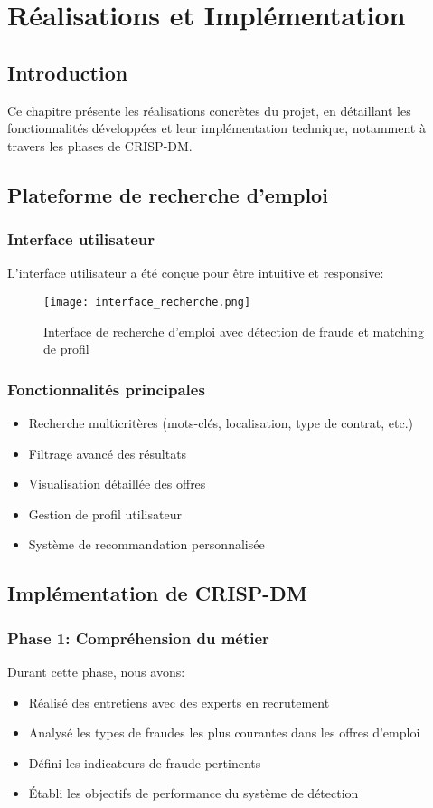 \documentclass[10pt,a4paper,twocolumn]{article}
\begin{document}
\section{Réalisations et Implémentation}
\subsection{Introduction}
Ce chapitre présente les réalisations concrètes du projet, en détaillant les fonctionnalités développées et leur implémentation technique, notamment à travers les phases de CRISP-DM.

\subsection{Plateforme de recherche d'emploi}
\subsubsection{Interface utilisateur}
L'interface utilisateur a été conçue pour être intuitive et responsive:
\begin{figure}[H]
\centering
\texttt{[image: interface\_recherche.png]}
\caption{Interface de recherche d'emploi avec détection de fraude et matching de profil}
\end{figure}

\subsubsection{Fonctionnalités principales}
\begin{itemize}
    \item Recherche multicritères (mots-clés, localisation, type de contrat, etc.)
    \item Filtrage avancé des résultats
    \item Visualisation détaillée des offres
    \item Gestion de profil utilisateur
    \item Système de recommandation personnalisée
\end{itemize}

\subsection{Implémentation de CRISP-DM}
\subsubsection{Phase 1: Compréhension du métier}
Durant cette phase, nous avons:
\begin{itemize}
    \item Réalisé des entretiens avec des experts en recrutement
    \item Analysé les types de fraudes les plus courantes dans les offres d'emploi
    \item Défini les indicateurs de fraude pertinents
    \item Établi les objectifs de performance du système de détection
\end{itemize}
\end{document}
